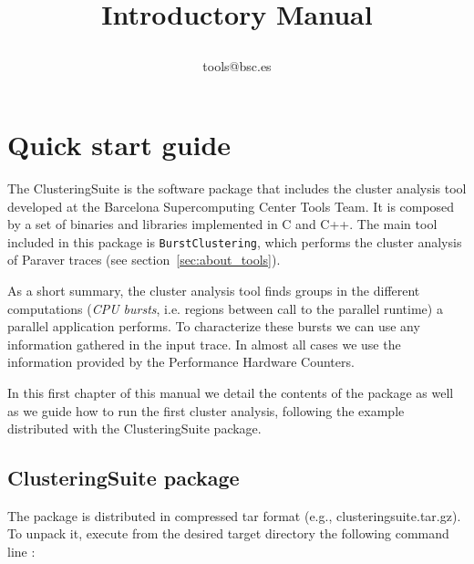 \documentclass[twoside,a4,english,11pt]{book}
\begin{document}
\graphicspath{{figures/}}

\title{ Introductory Manual
\author{
tools@bsc.es}}

\maketitle

\chapter{Quick start guide}

The \textsf{ClusteringSuite} is the software package that includes the cluster
analysis tool developed at the Barcelona Supercomputing Center Tools Team. 
It is composed by a set of binaries and libraries implemented in C and C++.
The main tool included in this package is \texttt{BurstClustering}, which
performs the cluster analysis of Paraver traces (see section~\ref{sec:about_tools}).

As a short summary, the cluster analysis tool finds groups in the different
computations (\emph{CPU bursts}, i.e. regions between call to the parallel
runtime) a parallel application performs. To characterize these bursts we can
use any information gathered in the input trace. In almost all cases we use the
information provided by the Performance Hardware Counters.

In this first chapter of this manual we detail the contents of the package
as well as we guide how to run the first cluster analysis, following the
example distributed with the \textsf{ClusteringSuite} package.

\section{\textsf{ClusteringSuite} package}

The package is distributed in compressed tar format (e.g., clusteringsuite.tar.gz).
To unpack it, execute from the desired target directory the following command line :

\begin{figure}[!h]
  
\end{figure}
\end{document}
